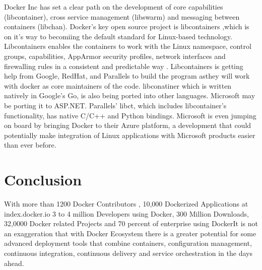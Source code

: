 \documentclass[9pt,twocolumn,twoside]{styles/osajnl}
\begin{document}
Docker Inc has set a clear path on the development of core
capabilities (libcontainer), cross service management (libswarm) and
messaging between containers (libchan). Docker's key open source
project is libcontainers ,which is on it's way to becomiing the
default standard for Linux-based technology.  Libcontainers enables
the containers to work with the Linux namespace, control groups,
capabilities, AppArmor security profiles, network interfaces and
firewalling rules in a consistent and predictable way .
\cite{www-docker-1}Libcontainers is getting help from Google, RedHat,
and Parallels to build the program asthey will work with docker as
core maintainers of the code.  libconatiner which is written natively
in Google's Go, is also being ported into other languages. Microsoft
may be porting it to ASP.NET.  Parallels' libct, which includes
libcontainer's functionality, has native C/C++ and Python
bindings. Microsoft is even jumping on board by bringing Docker to
their Azure platform, a development that could potentially make
integration of Linux applications with Microsoft products easier than
ever before.



\section{Conclusion}

\cite{www-docker-3}With more than 1200 Docker Contributors , 10,000 Dockerized
Applications at index.docker.io 3 to 4 million Developers using
Docker, 300 Million Downloads, 32,0000 Docker related Projects and 70
percent of enterprise using DockerIt is not an exaggeration that with
Docker Ecosystem there is a greater potential for some advanced
deployment tools that combine containers, configuration management,
continuous integration, continuous delivery and service orchestration
in the days ahead.



\end{document}
